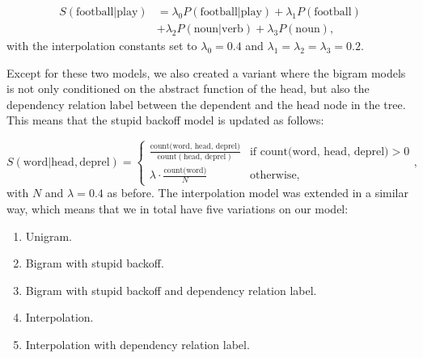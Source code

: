 \begin{align*}
    S(\text{football}|\text{play}) &= \lambda_0 P(\text{football}|\text{play}) + \lambda_1
    P(\text{football}) \\ &+ \lambda_2
    P(\text{noun}|\text{verb}) + \lambda_3
    P(\text{noun}),
\end{align*}
with the interpolation constants set to $\lambda_0 = 0.4$ and $\lambda_1=\lambda_2=\lambda_3=0.2$.

Except for these two models, we also created a variant where the bigram models is not only conditioned on the abstract function of the head, but also the dependency relation label between the dependent and the head node in the tree. This means that the stupid backoff model is updated as follows:

\begin{equation*}
S(\text{word} | \text{head}, \text{deprel}) = \begin{cases}
\frac{\text{count(word, head, deprel})}{\text{count}(\text{head, deprel})} & \text{if count(word, head, deprel)} > 0\\[.5em]
\lambda \cdot \frac{\text{count(word)}}{N} & \text{otherwise},
\end{cases},
\end{equation*}
with $N$ and $\lambda=0.4$ as before. The interpolation model was extended in a similar way, which means that we in total have five variations on our model:
\begin{enumerate}
    \item Unigram.
    \item Bigram with stupid backoff.
    \item Bigram with stupid backoff and dependency relation label.
    \item Interpolation.
    \item Interpolation with dependency relation label.
\end{enumerate}
